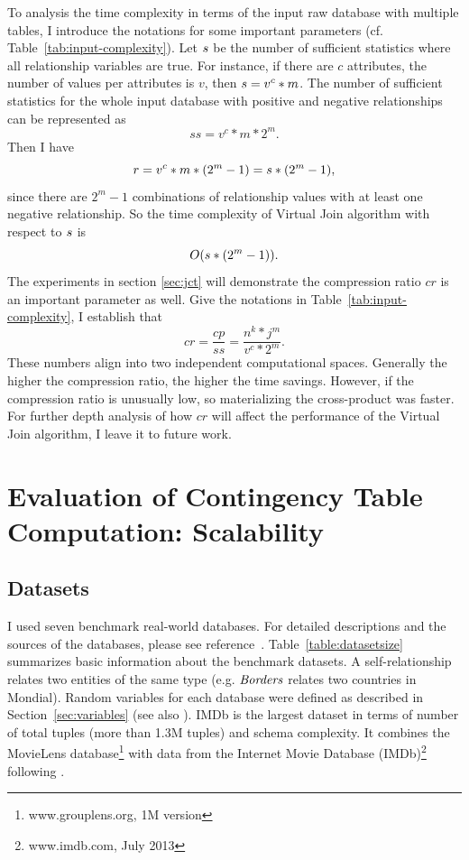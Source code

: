 \documentclass{sfuthesis}
\begin{document}
To  analysis the time complexity in terms of the input raw database with multiple tables, I  introduce the notations for some important parameters (cf. Table~\ref{tab:input-complexity}). Let $s$ be the number of sufficient statistics where all relationship variables are true. For instance, if there are $c$ attributes, the number of values per attributes is $v$, then $s = v^{c}*m$. 
The number of sufficient statistics for the whole input database with positive and negative relationships can be represented as $$ ss = v^{c}*m*2^{m}.$$
Then I  have $$ r  =  v^{c}*m * (2^{m}-1)  = s * (2^{m}-1), $$ since there are $2^{m}-1$ combinations of relationship values with at least one negative relationship.  So the time complexity of Virtual Join algorithm with respect to $s$ is $$O(s * (2^{m}-1)).$$
The experiments in section \ref{sec:jct} will demonstrate the compression ratio $cr$  is an important parameter as well.  Give the notations in Table~\ref{tab:input-complexity}, I  establish that $$ cr = \frac {cp} {ss} = \frac{n^{k}*j^{m}}{ v^{c}*2^{m}}. $$ These numbers align into two independent computational spaces. 
Generally the higher the compression ratio, the higher the time savings. However, if the compression ratio is unusually low, so materializing the cross-product was faster. For further depth analysis of how $cr$ will affect the performance of the Virtual Join algorithm, I leave it to future work.





\section{Evaluation of Contingency Table Computation: Scalability} \label{sec:data}


\subsection{Datasets}

I  used seven benchmark real-world databases. For detailed descriptions and  the sources of the databases, please see reference~\cite{Schulte2012}. Table~\ref{table:datasetsize} summarizes basic information about the benchmark datasets.  A  self-relationship %
relates two entities of the same type (e.g. $\it{Borders}$ relates two countries in Mondial). Random variables for each database were defined as described in Section~\ref{sec:variables} (see also \cite{Schulte2012}). IMDb is the largest dataset in terms of number of total tuples (more than 1.3M tuples) and schema complexity. %
It combines the MovieLens database\footnote{www.grouplens.org, 1M version} with data from the Internet Movie Database (IMDb)\footnote{www.imdb.com, July 2013} following \cite{Peralta2007}.
\end{document}
